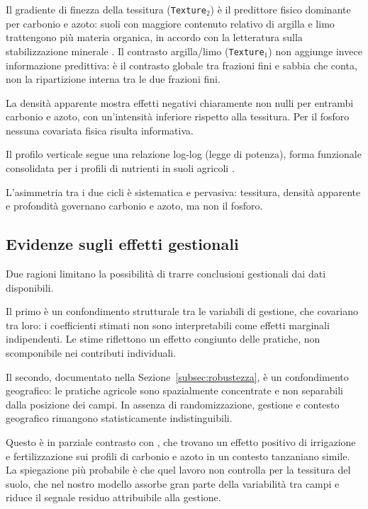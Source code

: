 \documentclass[11pt, a4paper]{article}
\begin{document}
Il gradiente di finezza della tessitura (\texttt{Texture$_2$}) è il predittore
fisico dominante per carbonio e azoto: suoli con maggiore contenuto relativo
di argilla e limo trattengono più materia organica, in accordo con la
letteratura sulla stabilizzazione minerale \citep{scientificreports2021}.
Il contrasto argilla/limo (\texttt{Texture$_1$}) non aggiunge invece informazione
predittiva: è il contrasto globale tra frazioni fini e sabbia che conta, non la
ripartizione interna tra le due frazioni fini.

La densità apparente mostra effetti negativi chiaramente non nulli per entrambi
carbonio e azoto, con un'intensità inferiore rispetto alla tessitura. Per il
fosforo nessuna covariata fisica risulta informativa.

Il profilo verticale segue una relazione log-log (legge di potenza), forma
funzionale consolidata per i profili di nutrienti in suoli agricoli
\citep{jobbagy2000}.

L'asimmetria tra i due cicli è sistematica e pervasiva: tessitura,
densità apparente e profondità governano carbonio e azoto, ma non il fosforo.

\subsection{Evidenze sugli effetti gestionali}

Due ragioni limitano la possibilità di trarre conclusioni gestionali dai
dati disponibili.

Il primo è un confondimento strutturale tra le variabili di gestione,
che covariano tra loro: i coefficienti stimati non sono interpretabili come
effetti marginali indipendenti. Le stime riflettono un effetto congiunto
delle pratiche, non scomponibile nei contributi individuali.

Il secondo, documentato nella Sezione~\ref{subsec:robustezza}, è un
confondimento geografico: le pratiche agricole sono spazialmente concentrate
e non separabili dalla posizione dei campi. In assenza di randomizzazione,
gestione e contesto geografico rimangono statisticamente indistinguibili.

Questo è in parziale contrasto con \citet{mutambu2019}, che trovano un
effetto positivo di irrigazione e fertilizzazione sui profili di carbonio
e azoto in un contesto tanzaniano simile. La spiegazione più probabile è
che quel lavoro non controlla per la tessitura del suolo, che nel nostro
modello assorbe gran parte della variabilità tra campi e riduce il segnale
residuo attribuibile alla gestione.
\end{document}
